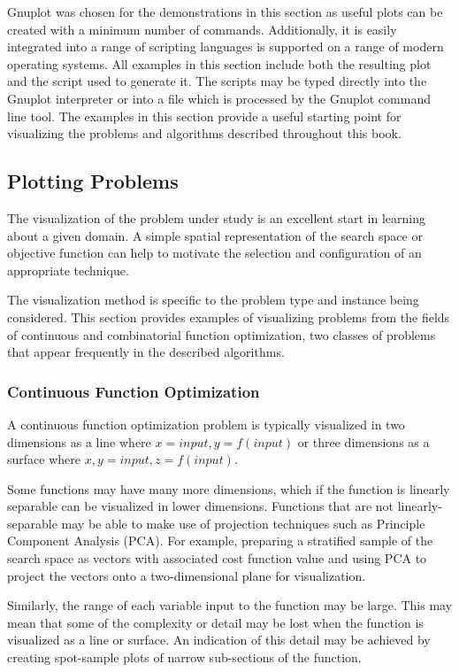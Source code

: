 Gnuplot was chosen for the demonstrations in this section as useful plots can be created with a minimum number of commands. Additionally, it is easily integrated into a range of scripting languages is supported on a range of modern operating systems.
All examples in this section include both the resulting plot and the script used to generate it. The scripts may be typed directly into the Gnuplot interpreter or into a file which is processed by the Gnuplot command line tool. The examples in this section provide a useful starting point for visualizing the problems and algorithms described throughout this book.

%
%
\subsection{Plotting Problems}
The visualization of the problem under study is an excellent start in learning about a given domain. A simple spatial representation of the search space or objective function can help to motivate the selection and configuration of an appropriate technique.

The visualization method is specific to the problem type and instance being considered.
This section provides examples of visualizing problems from the fields of continuous and combinatorial function optimization, two classes of problems that appear frequently in the described algorithms.

\subsubsection{Continuous Function Optimization}
A continuous function optimization problem is typically visualized in two dimensions as a line where $x=input, y=f(input)$ or three dimensions as a surface where $x,y=input, z=f(input)$.

Some functions may have many more dimensions, which if the function is linearly separable can be visualized in lower dimensions. Functions that are not linearly-separable may be able to make use of projection techniques such as Principle Component Analysis (PCA). For example, preparing a stratified sample of the search space as vectors with associated cost function value and using PCA to project the vectors onto a two-dimensional plane for visualization.

Similarly, the range of each variable input to the function may be large. This may mean that some of the complexity or detail may be lost when the function is visualized as a line or surface. An indication of this detail may be achieved by creating spot-sample plots of narrow sub-sections of the function.

